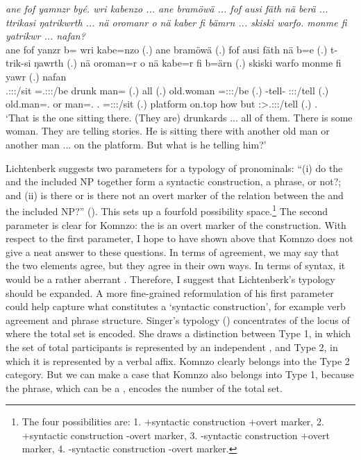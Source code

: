 \begin{exe}
	\ex \emph{ane fof yamnzr byé. wri kabenzo ... ane bramöwä ... fof ausi fäth nä berä ... ttrikasi ŋatrikwrth ... nä oromanr o nä kaber fi bämrn ... skiski warfo. monme fi yatrikwr ... nafan?}\\
	\gll ane fof yanzr b= wri kabe=nzo (.) ane bramöwä (.) fof ausi fäth nä b=e (.) t-trik-si ŋawrth (.) nä {oroman=r} o nä kabe=r fi b=ärn (.) skiski warfo monme fi yawr (.) nafan\\
	\Dem{} \Emph{} \Tsg.\Masc:\Sbj:\Nonpast:\Ipfv/sit \Med=\Tsg.\Masc:\Sbj:\Nonpast:\Ipfv/be drunk man=\Only{} (.) \Dem{} all (.) \Emph{} old.woman \Dim{} \Indf{} \Med=\Stpl:\Sbj:\Nonpast:\Ipfv/be (.) \Redup-tell-\Nmlz{} \Stpl:\Sbj:\Nonpast:\Ipfv/tell (.) \Indf{} {old.man=\Assoc.\Du} or \Indf{} man=\Assoc.\Du{} \Third.\Abs{} \Med=\Stdu:\Sbj:\Nonpast:\Ipfv/sit (.) platform on.top how but \Stsg:\Sbj>\Tsg.\Masc:\Io:\Nonpast:\Ipfv/tell (.) \Tsg.\Dat\\
	\trans `That is the one sitting there. (They are) drunkards ... all of them. There is some woman. They are telling stories. He is sitting there with another old man or another man ... on the platform. But what is he telling him?'\\
	\label{ex743}
\end{exe}

Lichtenberk suggests two parameters for a typology of  pronominals: ``(i) do the   and the included NP together form a syntactic construction, a phrase, or not?; and (ii) is there or is there not an overt marker of the relation between the   and the included NP?'' (\citeyear[3]{Lichtenberk:2000hr}). This sets up a fourfold possibility space.\footnote{The four possibilities are: 1. +syntactic construction +overt marker, 2. +syntactic construction -overt marker, 3. -syntactic construction +overt marker, 4. -syntactic construction -overt marker.} The second parameter is clear for Komnzo: the   is an overt marker of the  construction. With respect to the first parameter, I hope to have shown above that Komnzo does not give a neat answer to these questions. In terms of agreement, we may say that the two elements agree, but they agree in their own ways. In terms of  syntax, it would be a rather aberrant . Therefore, I suggest that Lichtenberk's typology should be expanded. A more fine-grained reformulation of his first parameter could help capture what constitutes a `syntactic construction', for example verb agreement and phrase structure. Singer's typology (\citeyear{Singer:inclu}) concentrates of the locus of where the total set is encoded. She draws a distinction between Type 1, in which the set of total participants is represented by an independent , and Type 2, in which it is represented by a verbal affix. Komnzo clearly belongs into the Type 2 category. But we can make a case that Komnzo also belongs into Type 1, because the  phrase, which can be a , encodes the number of the total set.%

